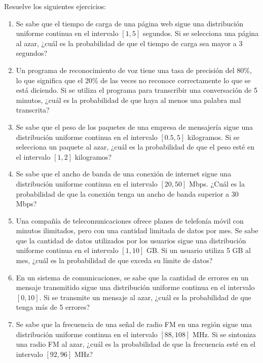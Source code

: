 \begin{Ejer}
Resuelve los siguientes ejercicios:
\begin{enumerate}

    \item Se sabe que el tiempo de carga de una página web sigue una distribución uniforme continua en el intervalo $[1, 5]$ segundos. Si se selecciona una página al azar, ¿cuál es la probabilidad de que el tiempo de carga sea mayor a 3 segundos?

    \item Un programa de reconocimiento de voz tiene una tasa de precisión del 80\%, lo que significa que el 20\% de las veces no reconoce correctamente lo que se está diciendo. Si se utiliza el programa para transcribir una conversación de 5 minutos, ¿cuál es la probabilidad de que haya al menos una palabra mal transcrita?

    \item Se sabe que el peso de los paquetes de una empresa de mensajería sigue una distribución uniforme continua en el intervalo $[0.5, 5]$ kilogramos. Si se selecciona un paquete al azar, ¿cuál es la probabilidad de que el peso esté en el intervalo $[1, 2]$ kilogramos?

    \item Se sabe que el ancho de banda de una conexión de internet sigue una distribución uniforme continua en el intervalo $[20, 50]$ Mbps. ¿Cuál es la probabilidad de que la conexión tenga un ancho de banda superior a 30 Mbps?

    \item Una compañía de telecomunicaciones ofrece planes de telefonía móvil con minutos ilimitados, pero con una cantidad limitada de datos por mes. Se sabe que la cantidad de datos utilizados por los usuarios sigue una distribución uniforme continua en el intervalo $[1, 10]$ GB. Si un usuario utiliza 5 GB al mes, ¿cuál es la probabilidad de que exceda su límite de datos?

    \item En un sistema de comunicaciones, se sabe que la cantidad de errores en un mensaje transmitido sigue una distribución uniforme continua en el intervalo $[0, 10]$. Si se transmite un mensaje al azar, ¿cuál es la probabilidad de que tenga más de 5 errores?

    \item Se sabe que la frecuencia de una señal de radio FM en una región sigue una distribución uniforme continua en el intervalo $[88, 108]$ MHz. Si se sintoniza una radio FM al azar, ¿cuál es la probabilidad de que la frecuencia esté en el intervalo $[92, 96]$ MHz?


\end{enumerate}
\end{Ejer}
